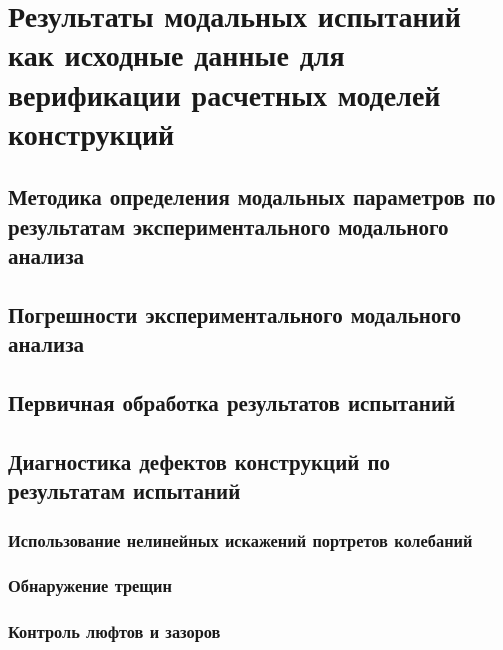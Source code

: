 \chapter{Результаты модальных испытаний как исходные данные для верификации расчетных моделей конструкций}

\section{Методика определения модальных параметров по результатам экспериментального модального анализа}


\section{Погрешности экспериментального модального анализа}

 
\section{Первичная обработка результатов испытаний}


\section{Диагностика дефектов конструкций по результатам испытаний}


\subsection{Использование нелинейных искажений портретов колебаний}


\subsection{Обнаружение трещин}

\subsection{Контроль люфтов и зазоров}


